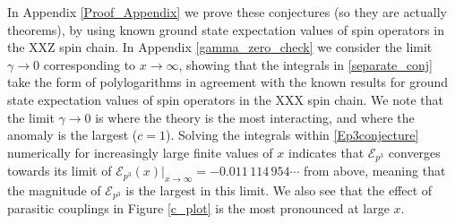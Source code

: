 \documentclass[a4paper,10pt]{article}
\newcommand{\linnea}[1]{$\framebox{\tiny L}$\ \textbf{\texttt{{\color{red}\footnotesize#1}}}}
\begin{document}
\vspace*{5pt}
\noindent{}
\vspace*{5pt}

\noindent
In Appendix \ref{Proof_Appendix} we prove these conjectures (so they are actually theorems), by using known ground state expectation values of spin operators in the XXZ spin chain\cite{Go_Kato}.  In Appendix \ref{gamma_zero_check} we consider the limit $\gamma \to 0$ corresponding to $x \to \infty$, showing that the integrals in \eqref{separate_conj} take the form of polylogarithms in agreement with the known results for ground state expectation values of spin operators in the XXX spin chain\cite{Takahashi}. 
We note that the limit $\gamma\to 0$ is where the theory is the most interacting, and where the anomaly is the largest ($c=1$). Solving the integrals within \eqref{Ep3conjecture} numerically for increasingly large finite values of $x$ indicates that $\mathcal{E}_{p^3}$ converges towards its limit of $\mathcal{E}_{p^3}(x)\big|_{x\to\infty}=-0.011\,114\,954\cdots$ from above, meaning that the magnitude of $\mathcal{E}_{p^3}$ is the largest in this limit. We also see that the effect of parasitic couplings in Figure \ref{c_plot} is the most pronounced at large $x$.  
 
\end{document}
